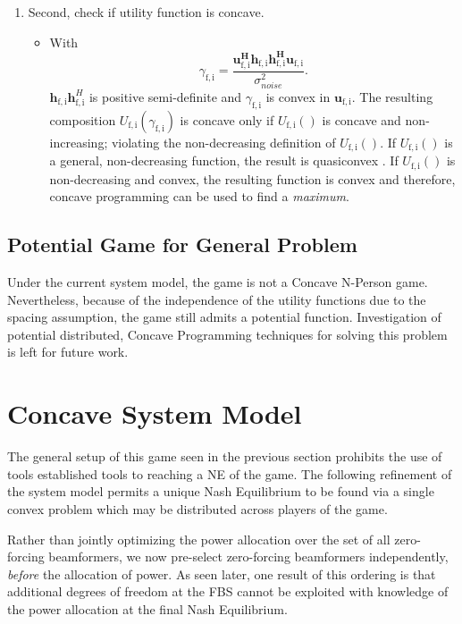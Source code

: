 \documentclass[12pt,a4paper]{report}
\begin{document}
\begin{enumerate}
\item Second, check if utility function is concave.
\begin{itemize}
\item 
With
	\begin{equation*}\label{zf_snr}
	\gamma_{\mathrm{f,i}} = 
	\frac{\mathbf{u^H_{\mathrm{f,i}}h_{\mathrm{f,i}}h^H_{\mathrm{f,i}}u_{\mathrm{f,i}}}}
	{\sigma^2_{noise}  
	}.
	\end{equation*}
	 $\mathbf{h}_{\mathrm{f,i}}\mathbf{h}^H_{\mathrm{f,i}}$ is positive semi-definite and $\gamma_{\mathrm{f,i}}$ is convex in ${\mathbf{u}_{\mathrm{f,i}}}$. 
	 The resulting composition $U_{\mathrm{f,i}}(\gamma_{\mathrm{f,i}}) $ is concave only if $U_{\mathrm{f,i}}() $ is concave and non-increasing; violating the non-decreasing definition of $U_{\mathrm{f,i}}() $.
If $U_{\mathrm{f,i}}() $ is a general, non-decreasing function, the result is quasiconvex \cite[p.~102]{BoV:04}. If $U_{\mathrm{f,i}}() $ is  non-decreasing and convex, the resulting
   function is convex and therefore, concave programming can be used to find a \emph{maximum}. 
\end{itemize}

\end{enumerate}

\subsection{Potential Game for General Problem}
Under the current system model, the game is not a Concave N-Person game. Nevertheless, because of the independence of the utility functions due to the spacing assumption, the game still admits a potential function. Investigation of potential distributed, Concave Programming techniques for solving this problem is left for future work. 

\section{Concave System Model}\label{conmodel}

The general setup of this game seen in the previous section prohibits the use of tools established tools to reaching a NE of the game.
The following refinement of the system model permits a unique Nash Equilibrium to be found via a single convex problem which may be distributed across players of the game.
\par
Rather than jointly optimizing the power allocation over the set of all zero-forcing beamformers, we now pre-select zero-forcing beamformers independently, \emph{before} the allocation of power.
As seen later, one result of this ordering is that additional degrees of freedom at the FBS cannot be exploited with knowledge of the power allocation at the final Nash Equilibrium.
\end{document}
